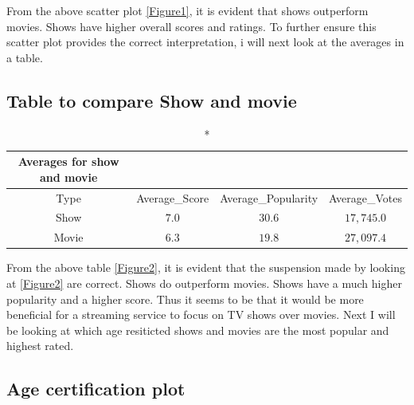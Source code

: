 \documentclass[11pt,preprint, authoryear]{elsarticle}
\numberwithin{equation}{section}
\numberwithin{figure}{section}
\numberwithin{table}{section}
\begin{document}
From the above scatter plot \ref{Figure1}, it is evident that shows
outperform movies. Shows have higher overall scores and ratings. To
further ensure this scatter plot provides the correct interpretation, i
will next look at the averages in a table.

\hypertarget{table-to-compare-show-and-movie}{%
\subsection{Table to compare Show and
movie}\label{table-to-compare-show-and-movie}}

\begin{longtable}{cccc}
\caption*{
{\large Averages for show and movie}
} \\ 
\toprule
Type & Average\_Score & Average\_Popularity & Average\_Votes \\ 
\midrule
Show & $7.0$ & $30.6$ & $17,745.0$ \\ 
Movie & $6.3$ & $19.8$ & $27,097.4$ \\ 
\bottomrule
\end{longtable}

From the above table \ref{Figure2}, it is evident that the suspension
made by looking at \ref{Figure2} are correct. Shows do outperform
movies. Shows have a much higher popularity and a higher score. Thus it
seems to be that it would be more beneficial for a streaming service to
focus on TV shows over movies. Next I will be looking at which age
resiticted shows and movies are the most popular and highest rated.

\hypertarget{age-certification-plot}{%
\subsection{Age certification plot}\label{age-certification-plot}}
\end{document}
